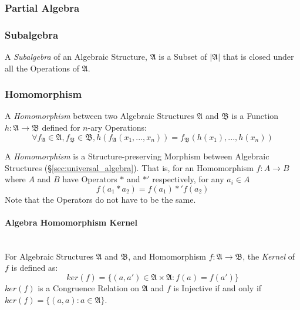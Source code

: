 \subsubsection{Partial Algebra}\label{sec:partial_algebra}

\subsubsection{Subalgebra}\label{sec:subalgebra}

A \emph{Subalgebra} of an Algebraic Structure, $\mathfrak{A}$ is a
Subset of $|\mathfrak{A}|$ that is closed under all the Operations of
$\mathfrak{A}$.



\subsubsection{Homomorphism}\label{sec:homomorphism}

A \emph{Homomorphism} between two Algebraic Structures $\mathfrak{A}$
and $\mathfrak{B}$ is a Function $h: \mathfrak{A} \rightarrow
\mathfrak{B}$ defined for $n$-ary Operations:
\[
  \forall f_\mathfrak{A} \in \mathfrak{A}, f_\mathfrak{B} \in
  \mathfrak{B}, h(f_\mathfrak{A}(x_1, ..., x_n)) =
  f_\mathfrak{B}(h(x_1), ..., h(x_n))
\]


A \emph{Homomorphism} is a Structure-preserving Morphism between
Algebraic Structures (\S\ref{sec:universal_algebra}). That is, for
an Homomorphism $f : A \rightarrow B$ where $A$ and $B$ have Operators
$*$ and $*'$ respectively, for any $a_i \in A$
\[
  f(a_1 * a_2) = f(a_1) *' f(a_2)
\]
\HandRight\;Note that the Operators do not have to be the same.



\paragraph{Algebra Homomorphism Kernel}
\label{sec:algebra_homomorphism_kernel} \hfill \\

For Algebraic Structures $\mathfrak{A}$ and $\mathfrak{B}$, and
Homomorphism $f: \mathfrak{A} \rightarrow \mathfrak{B}$, the
\emph{Kernel} of $f$ is defined as:
\[
    ker(f) = \{ (a,a') \in \mathfrak{A} \times \mathfrak{A} : f(a) = f(a') \}
\]
$ker(f)$ is a Congruence Relation on $\mathfrak{A}$ and $f$ is Injective if and
only if $ker(f) = \{(a,a) : a \in \mathfrak{A}\}$.

